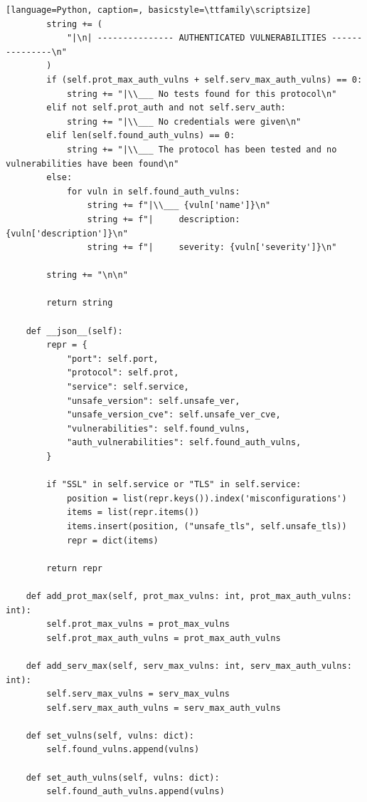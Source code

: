 \documentclass[12pt]{report}
\begin{document}
\begin{lstlisting}[language=Python, caption=, basicstyle=\ttfamily\scriptsize]
        string += (
            "|\n| --------------- AUTHENTICATED VULNERABILITIES ---------------\n"
        )
        if (self.prot_max_auth_vulns + self.serv_max_auth_vulns) == 0:
            string += "|\\___ No tests found for this protocol\n"
        elif not self.prot_auth and not self.serv_auth:
            string += "|\\___ No credentials were given\n"
        elif len(self.found_auth_vulns) == 0:
            string += "|\\___ The protocol has been tested and no vulnerabilities have been found\n"
        else:
            for vuln in self.found_auth_vulns:
                string += f"|\\___ {vuln['name']}\n"
                string += f"|     description: {vuln['description']}\n"
                string += f"|     severity: {vuln['severity']}\n"

        string += "\n\n"

        return string

    def __json__(self):
        repr = {
            "port": self.port,
            "protocol": self.prot,
            "service": self.service,
            "unsafe_version": self.unsafe_ver,
            "unsafe_version_cve": self.unsafe_ver_cve,
            "vulnerabilities": self.found_vulns,
            "auth_vulnerabilities": self.found_auth_vulns,
        }

        if "SSL" in self.service or "TLS" in self.service:
            position = list(repr.keys()).index('misconfigurations')
            items = list(repr.items())
            items.insert(position, ("unsafe_tls", self.unsafe_tls))
            repr = dict(items)

        return repr

    def add_prot_max(self, prot_max_vulns: int, prot_max_auth_vulns: int):
        self.prot_max_vulns = prot_max_vulns
        self.prot_max_auth_vulns = prot_max_auth_vulns

    def add_serv_max(self, serv_max_vulns: int, serv_max_auth_vulns: int):
        self.serv_max_vulns = serv_max_vulns
        self.serv_max_auth_vulns = serv_max_auth_vulns

    def set_vulns(self, vulns: dict):
        self.found_vulns.append(vulns)

    def set_auth_vulns(self, vulns: dict):
        self.found_auth_vulns.append(vulns)
\end{lstlisting}
\end{document}

